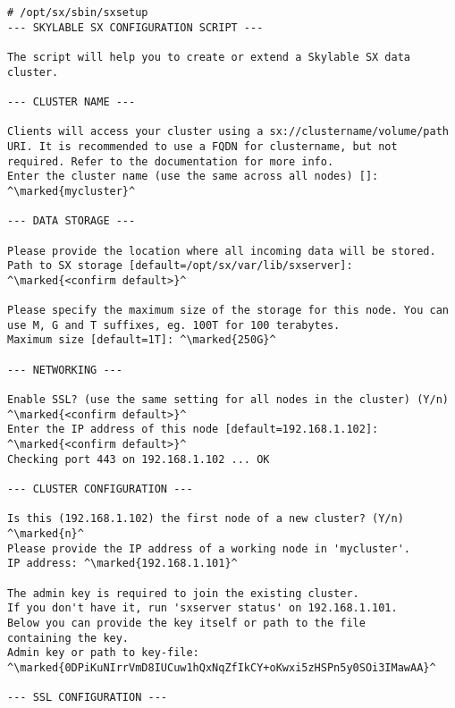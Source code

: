 \small
\begin{lstlisting}
# /opt/sx/sbin/sxsetup
--- SKYLABLE SX CONFIGURATION SCRIPT ---

The script will help you to create or extend a Skylable SX data
cluster.

--- CLUSTER NAME ---

Clients will access your cluster using a sx://clustername/volume/path
URI. It is recommended to use a FQDN for clustername, but not
required. Refer to the documentation for more info.
Enter the cluster name (use the same across all nodes) []: ^\marked{mycluster}^

--- DATA STORAGE ---

Please provide the location where all incoming data will be stored.
Path to SX storage [default=/opt/sx/var/lib/sxserver]: ^\marked{<confirm default>}^

Please specify the maximum size of the storage for this node. You can
use M, G and T suffixes, eg. 100T for 100 terabytes.
Maximum size [default=1T]: ^\marked{250G}^

--- NETWORKING ---

Enable SSL? (use the same setting for all nodes in the cluster) (Y/n)
^\marked{<confirm default>}^
Enter the IP address of this node [default=192.168.1.102]: ^\marked{<confirm default>}^
Checking port 443 on 192.168.1.102 ... OK

--- CLUSTER CONFIGURATION ---

Is this (192.168.1.102) the first node of a new cluster? (Y/n) ^\marked{n}^
Please provide the IP address of a working node in 'mycluster'.
IP address: ^\marked{192.168.1.101}^

The admin key is required to join the existing cluster.
If you don't have it, run 'sxserver status' on 192.168.1.101.
Below you can provide the key itself or path to the file
containing the key.
Admin key or path to key-file:
^\marked{0DPiKuNIrrVmD8IUCuw1hQxNqZfIkCY+oKwxi5zHSPn5y0SOi3IMawAA}^

--- SSL CONFIGURATION ---


\end{lstlisting}

